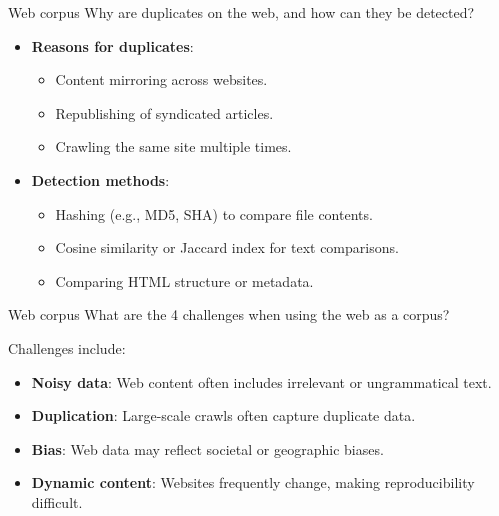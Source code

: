 \documentclass{article}
\begin{document}
\begin{exercise}{Web corpus}
  Why are duplicates on the web, and how can they be detected?

  \begin{solution}
    \begin{itemize}
        \item \textbf{Reasons for duplicates}:
        \begin{itemize}
            \item Content mirroring across websites.
            \item Republishing of syndicated articles.
            \item Crawling the same site multiple times.
        \end{itemize}
        \item \textbf{Detection methods}:
        \begin{itemize}
            \item Hashing (e.g., MD5, SHA) to compare file contents.
            \item Cosine similarity or Jaccard index for text comparisons.
            \item Comparing HTML structure or metadata.
        \end{itemize}
    \end{itemize}
  \end{solution}
\end{exercise}

\begin{exercise}{Web corpus}
  What are the 4 challenges when using the web as a corpus?

  \begin{solution}
    Challenges include:
    \begin{itemize}
        \item \textbf{Noisy data}: Web content often includes irrelevant or ungrammatical text.
        \item \textbf{Duplication}: Large-scale crawls often capture duplicate data.
        \item \textbf{Bias}: Web data may reflect societal or geographic biases.
        \item \textbf{Dynamic content}: Websites frequently change, making reproducibility difficult.
    \end{itemize}
  \end{solution}
\end{exercise}
\end{document}
